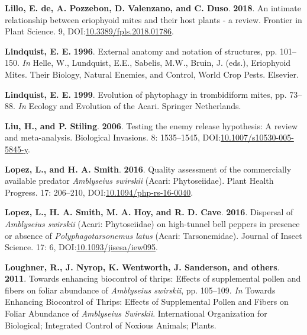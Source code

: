 \documentclass[12pt,final,CPage]{ufthesis}
\newlength{\cslhangindent}
\newenvironment{CSLReferences}[2] %
{%
	\setlength{\parindent}{0pt}
	\ifodd #1 \everypar{\setlength{\hangindent}{\cslhangindent}}\ignorespaces\fi
	\ifnum #2 > 0
	\setlength{\parskip}{#2\baselineskip}
	\fi
}%
{}
\begin{document}
{\begin{CSLReferences}{1}{0}
  \leavevmode{}%
  \textbf{Lillo, E. de, A. Pozzebon, D. Valenzano, and C. Duso}. \textbf{2018}. An intimate relationship between eriophyoid mites and their host plants - a review. Frontier in Plant Science. 9, DOI:\href{https://doi.org/10.3389/fpls.2018.01786}{10.3389/fpls.2018.01786}.

  \leavevmode{}%
  \textbf{Lindquist, E. E.} \textbf{1996}. External anatomy and notation of structures, pp. 101--150. \emph{In} Helle, W., Lundquist, E.E., Sabelis, M.W., Bruin, J. (eds.), Eriophyoid Mites. Their Biology, Natural Enemies, and Control, World Crop Pests. Elsevier.

  \leavevmode{}%
  \textbf{Lindquist, E. E.} \textbf{1999}. Evolution of phytophagy in trombidiform mites, pp. 73--88. \emph{In} Ecology and Evolution of the Acari. Springer Netherlands.

  \leavevmode{}%
  \textbf{Liu, H., and P. Stiling}. \textbf{2006}. Testing the enemy release hypothesis: A review and meta-analysis. Biological Invasions. 8: 1535--1545, DOI:\href{https://doi.org/10.1007/s10530-005-5845-y}{10.1007/s10530-005-5845-y}.

  \leavevmode{}%
  \textbf{Lopez, L., and H. A. Smith}. \textbf{2016}. Quality assessment of the commercially available predator {\emph{Amblyseius swirskii}} ({Acari}: {Phytoseiidae}). Plant Health Progress. 17: 206--210, DOI:\href{https://doi.org/10.1094/php-rs-16-0040}{10.1094/php-rs-16-0040}.

  \leavevmode{}%
  \textbf{Lopez, L., H. A. Smith, M. A. Hoy, and R. D. Cave}. \textbf{2016}. Dispersal of {\emph{Amblyseius swirskii}} ({Acari}: {Phytoseiidae}) on high-tunnel bell peppers in presence or absence of {\emph{Polyphagotarsonemus latus}} ({Acari}: {Tarsonemidae}). Journal of Insect Science. 17: 6, DOI:\href{https://doi.org/10.1093/jisesa/iew095}{10.1093/jisesa/iew095}.

  \leavevmode{}%
  \textbf{Loughner, R., J. Nyrop, K. Wentworth, J. Sanderson, and others}. \textbf{2011}. Towards enhancing biocontrol of thrips: Effects of supplemental pollen and fibers on foliar abundance of {\emph{Amblyseius swirskii}}, pp. 105--109. \emph{In} Towards Enhancing Biocontrol of Thrips: Effects of Supplemental Pollen and Fibers on Foliar Abundance of {\emph{Amblyseius Swirskii}}. International Organization for Biological; Integrated Control of Noxious Animals; Plants.


\end{CSLReferences}}
\end{document}
